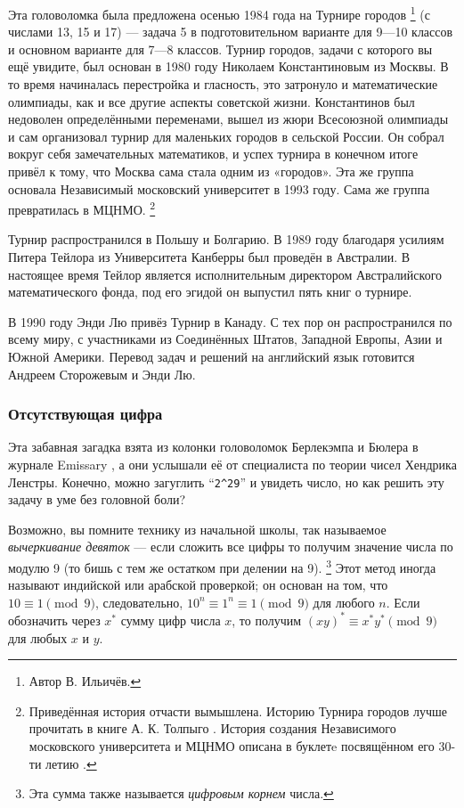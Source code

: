Эта головоломка была предложена осенью 1984 года на Турнире городов%
\footnote{Автор В. Ильичёв.\pr} (с числами 13, 15 и 17) --- задача 5 в подготовительном варианте для 9---10 классов и основном варианте для 7---8 классов.
Турнир городов, задачи с которого вы ещё увидите, был основан в 1980 году Николаем Константиновым из Москвы.
В то время начиналась перестройка и гласность, это затронуло и математические олимпиады, как и все другие аспекты советской жизни.
Константинов был недоволен определёнными переменами, вышел из жюри Всесоюзной олимпиады и сам организовал турнир для маленьких городов в сельской России.
Он собрал вокруг себя замечательных математиков, и успех турнира в конечном итоге привёл к тому, что Москва сама стала одним из «городов».
Эта же группа основала Независимый московский университет в 1993 году.
Сама же группа превратилась в МЦНМО.%
\footnote{Приведённая история отчасти вымышлена. Историю Турнира городов лучше прочитать в книге А. К. Толпыго \cite{Tolpygo2010}.
История создания Независимого московского университета и МЦНМО описана в буклетe посвящённом его 30-ти летию \cite{mcnmo-30}. \pr}

Турнир распространился в Польшу и Болгарию.
В 1989 году благодаря усилиям Питера Тейлора из Университета Канберры был проведён в Австралии.
В настоящее время Тейлор является исполнительным директором Австралийского математического фонда, под его эгидой он выпустил пять книг о турнире.

В 1990 году Энди Лю привёз Турнир в Канаду.
С тех пор он распространился по всему миру, с участниками из Соединённых Штатов, Западной Европы, Азии и Южной Америки.
Перевод задач и решений на английский язык готовится Андреем Сторожевым и Энди Лю.

\subsubsection*{Отсутствующая цифра}

Эта забавная загадка взята из колонки головоломок Берлекэмпа и Бюлера в журнале Emissary \cite[весна/осень 2006 года]{3},
а они услышали её от специалиста по теории чисел Хендрика Ленстры.
Конечно, можно загуглить ``\texttt{2\^{}29}'' и увидеть число, но как решить эту задачу в уме без головной боли?

Возможно, вы помните технику из начальной школы, так называемое \emph{вычеркивание девяток} --- если сложить все цифры то получим значение числа по модулю 9 (то бишь с тем же остатком при делении на 9).
\footnote{Эта сумма также называется \emph{цифровым корнем} числа. \pr}
Этот метод иногда называют индийской или арабской проверкой;
он основан на том, что $10 \equiv 1 \pmod 9$, следовательно, $10^n \equiv 1^n \equiv 1 \pmod 9$ для любого $n$.
Если обозначить через $x^*$ сумму цифр числа $x$, то получим $(xy)^* \equiv x^* y^* \pmod 9$ для любых $x$ и $y$.

